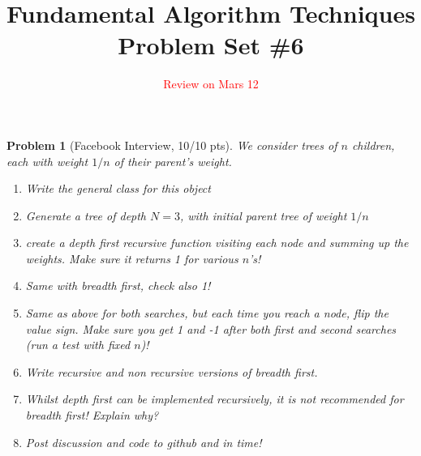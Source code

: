 \documentclass[11pt]{article}
\title{\textbf{Fundamental Algorithm Techniques} \\ Problem Set \#6} %
\date{\textcolor{red}{Review on Mars 12}} %
\newtheorem{problem}{Problem}
\begin{document}
\maketitle



\begin{problem}[Facebook Interview, 10/10 pts]
We consider trees of $n$ children,  each with weight $1/n$ of their parent's weight.
\begin{enumerate}
    \item Write the general class for this object 
    \item Generate a tree of depth $N=3$, with initial parent tree of weight $1/n$
    \item create a depth first recursive function visiting each node and summing up the weights. Make sure it returns 1 for various $n$'s! 
    \item Same with breadth first, check also 1!
    \item Same as above for both searches, but each time you reach a node, flip the value sign. Make sure you get 1 and -1 after both first and second searches (run a test with fixed $n$)!
    \item Write recursive and non recursive versions of breadth first.
    \item Whilst depth first can be implemented recursively, it is not recommended for breadth first! Explain why? 
    \item Post discussion and code to github and in time!
\end{enumerate}

\end{problem}
\end{document}
